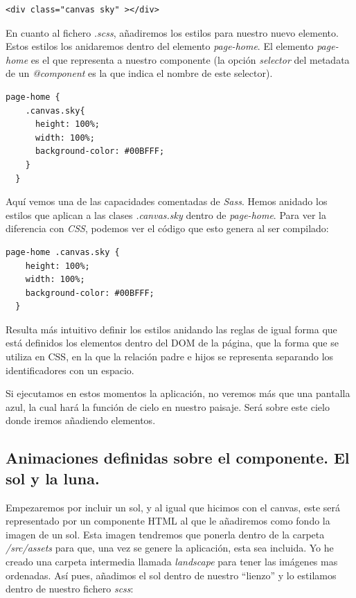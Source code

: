 \begin{lstlisting}[style=htmlcssjs,frame=tlrb, xleftmargin={0.2cm}]
  <div class="canvas sky" ></div>
\end{lstlisting}

En cuanto al fichero \emph{.scss}, añadiremos los estilos para nuestro nuevo elemento. Estos estilos los anidaremos dentro del elemento \emph{page-home}. El elemento \emph{page-home} es el que representa a nuestro componente (la opción \emph{selector} del metadata de un \emph{@component} es la que indica el nombre de este selector).

\begin{lstlisting}[style=htmlcssjs,frame=tlrb, xleftmargin={0.2cm}]
  page-home {
    .canvas.sky{
      height: 100%;
      width: 100%;
      background-color: #00BFFF;
    }
  }
\end{lstlisting}

Aquí vemos una de las capacidades comentadas de \emph{Sass}. Hemos anidado los estilos que aplican a las clases \emph{.canvas.sky} dentro de \emph{page-home}. Para ver la diferencia con \emph{CSS}, podemos ver el código que esto genera al ser compilado:

\begin{lstlisting}[style=htmlcssjs,frame=tlrb, xleftmargin={0.2cm}]
  page-home .canvas.sky {
    height: 100%;
    width: 100%;
    background-color: #00BFFF;
  }
\end{lstlisting}

Resulta más intuitivo definir los estilos anidando las reglas de igual forma que está definidos los elementos dentro del \gls{DOM} de la página, que la forma que se utiliza en \gls{CSS}, en la que la relación padre e hijos se representa separando los identificadores con un espacio.

Si ejecutamos en estos momentos la aplicación, no veremos más que una pantalla azul, la cual hará la función de cielo en nuestro paisaje. Será sobre este cielo donde iremos añadiendo elementos.

\subsection{Animaciones definidas sobre el componente. El sol y la luna.}


Empezaremos por incluir un sol, y al igual que hicimos con el canvas, este será representado por un componente \gls{HTML} al que le añadiremos como fondo la imagen de un sol. Esta imagen tendremos que ponerla dentro de la carpeta \emph{/src/assets} para que, una vez se genere la aplicación, esta sea incluida. Yo he creado una carpeta intermedia llamada \emph{landscape} para tener las imágenes mas ordenadas. Así pues, añadimos el sol dentro de nuestro ``lienzo'' y lo estilamos dentro de nuestro fichero \emph{scss}:

